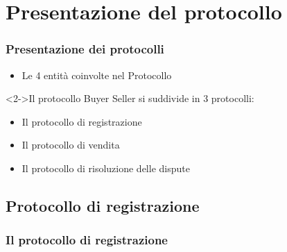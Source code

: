 \section{Presentazione del protocollo}
\begin{frame}
\frametitle{Presentazione dei protocolli}
\begin{overprint}
\begin{center}\end{center}
\begin{center}\end{center}
\begin{center}\end{center}
\begin{center}\end{center}
\end{overprint}
\begin{overprint}
\begin{itemize}
\item Le 4 entità coinvolte nel Protocollo
\end{itemize}
\begin{block}<2->{Il protocollo Buyer Seller si suddivide in 3 protocolli:}
\begin{itemize}
\item<2-> \alert<2,2>{Il protocollo di registrazione}
\item<3-> \alert<3,3>{Il protocollo di vendita}
\item<4-> \alert<4,4>{Il protocollo di risoluzione delle dispute}
\end{itemize}
\end{block}
\end{overprint}
\end{frame}

\subsection{Protocollo di registrazione}
\begin{frame}
\frametitle{Il protocollo di registrazione}
\begin{overprint}
    \begin{center}\end{center}
    \begin{center}\end{center}
    \begin{center}\end{center} 
    \end{overprint}
\end{frame}

